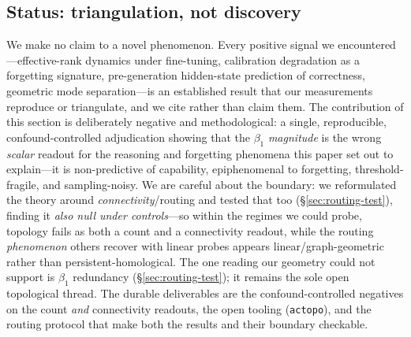 \documentclass{article}
\begin{document}
\subsection{Status: triangulation, not discovery}
\label{sec:empirical-status}
We make no claim to a novel phenomenon. Every positive signal we encountered---effective-rank
dynamics under fine-tuning, calibration degradation as a forgetting signature, pre-generation
hidden-state prediction of correctness, geometric mode separation---is an established result that
our measurements reproduce or triangulate, and we cite rather than claim them. The contribution
of this section is deliberately negative and methodological: a single, reproducible,
confound-controlled adjudication showing that the \(\beta_1\) \emph{magnitude} is the
wrong \emph{scalar} readout for the reasoning and forgetting phenomena this paper set out to
explain---it is non-predictive of capability, epiphenomenal to forgetting, threshold-fragile, and
sampling-noisy. We are careful about the boundary: we reformulated the theory around \emph{connectivity}/routing and
tested that too (\S\ref{sec:routing-test}), finding it \emph{also null under controls}---so within the
regimes we could probe, topology fails as both a count and a connectivity readout, while the routing
\emph{phenomenon} others recover with linear probes \citep{chains2dags2601,reasoningTrajectories2604}
appears linear/graph-geometric rather than persistent-homological. The one reading our geometry could
not support is $\beta_1$ redundancy (\S\ref{sec:routing-test}); it remains the sole open
topological thread. The durable deliverables are the confound-controlled negatives on the count
\emph{and} connectivity readouts, the open tooling (\texttt{actopo}), and the routing protocol that
make both the results and their boundary checkable.
\end{document}

